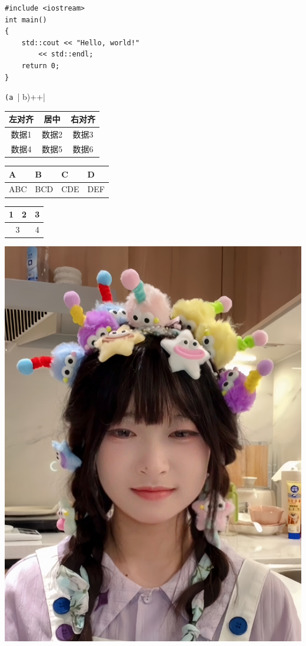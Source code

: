 \documentclass{ctexart}
\begin{document}
\begin{verbatim}
#include <iostream>
int main()
{
    std::cout << "Hello, world!"
        << std::endl;
    return 0;
}
\end{verbatim}
\verb|(a || b)++|
\\
\centering
\begin{tabular}{|c|c|c|}
  \hline
  左对齐 & 居中 & 右对齐 \\
  \hline
  数据1 & 数据2 & 数据3 \\
  \cline{1-2}
  数据4 & 数据5 & 数据6 \\
  \hline
\end{tabular}
\par
\begin{tabularx}{14em}
  {|*{4}{>{\centering\arraybackslash}X|}}
  \hline
  A & B & C & D \\
  \hline
  ABC & BCD & CDE & DEF \\
  \hline
\end{tabularx}
\par
\begin{tabular}{|c|c|c|}
    \hline
    1 & 2 & 3 \\
    \hline
    \multicolumn{2}{|c|}{3} & 4\\
    \hline
    
\end{tabular}
\par
\includegraphics[scale = 0.1]{test.jpg}
\end{document}
